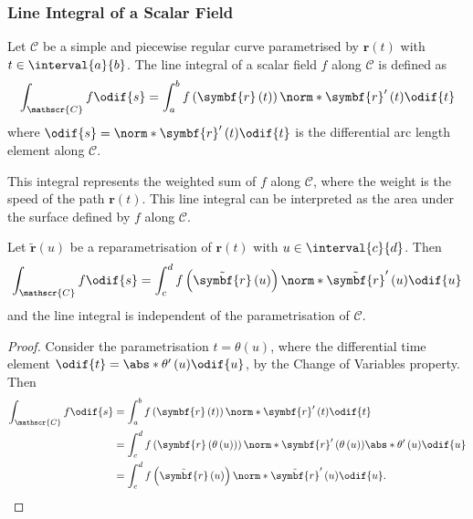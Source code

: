 \documentclass{article}
\begin{document}
\subsubsection{Line Integral of a Scalar Field}
Let \(\mathscr{C}\) be a simple and piecewise regular curve
parametrised by \(\symbf{r}\left( t \right)\) with \(t \in
\interval{a}{b}\). The line integral of a scalar field \(f\) along
\(\mathscr{C}\) is defined as
\begin{equation*}
    \int_{\mathscr{C}} f \odif{s} = \int_a^b f\left( \symbf{r}\left( t \right) \right) \norm*{\symbf{r}'\left( t \right)} \odif{t}
\end{equation*}
where \(\odif{s} = \norm*{\symbf{r}'\left( t \right)} \odif{t}\) is the
differential arc length element along \(\mathscr{C}\).

This integral represents the weighted sum of \(f\) along
\(\mathscr{C}\), where the weight is the speed of the path
\(\symbf{r}\left( t \right)\). This line integral can be interpreted as
the area under the surface defined by \(f\) along \(\mathscr{C}\).
\begin{lemma}
    Let \(\tilde{\symbf{r}}\left( u \right)\) be a
    reparametrisation of \(\symbf{r}\left( t \right)\) with \(u \in
    \interval{c}{d}\). Then
    \begin{equation*}
        \int_{\mathscr{C}} f \odif{s} = \int_c^d f\left( \tilde{\symbf{r}}\left( u \right) \right) \norm*{\tilde{\symbf{r}}'\left( u \right)} \odif{u}
    \end{equation*}
    and the line integral is independent of the parametrisation of
    \(\mathscr{C}\).
\end{lemma}
\begin{proof}
    Consider the parametrisation \(t = \theta\left( u \right)\),
    where the differential time element
    \(\odif{t} = \abs*{\theta'\left( u \right)} \odif{u}\), by the
    Change of Variables property. Then
    \begin{align*}
        \int_{\mathscr{C}} f \odif{s} & = \int_a^b f\left( \symbf{r}\left( t \right) \right) \norm*{\symbf{r}'\left( t \right)} \odif{t}                                                                          \\
                                      & = \int_c^d f\left( \symbf{r}\left( \theta\left( u \right) \right) \right) \norm*{\symbf{r}'\left( \theta\left( u \right) \right)} \abs*{\theta'\left( u \right)} \odif{u} \\
                                      & = \int_c^d f\left( \tilde{\symbf{r}}\left( u \right) \right) \norm*{\tilde{\symbf{r}}'\left( u \right)} \odif{u}.
    \end{align*}
\end{proof}
\end{document}
